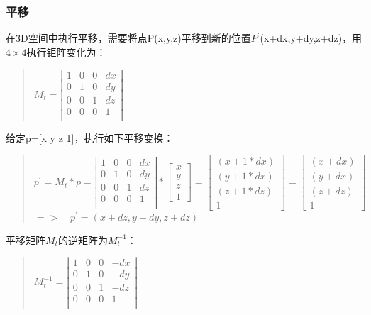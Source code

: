 \documentclass[a4paper,10pt]{article}
\begin{document}
\begin{CJK}{UTF8}{song}
\subsubsection{平移}
在3D空间中执行平移，需要将点P(x,y,z)平移到新的位置$P^{'}$(x+dx,y+dy,z+dz)，用$4\times 4$执行钜阵变化为：
\begin{quote}
\begin{math}
M_{t}=\left|
\begin{array}{cccc}
1&0&0&dx \\
0&1&0&dy \\
0&0&1&dz \\
0&0&0&1 \\
\end{array}
\right|
\end{math} 
\end{quote}
给定p=[x y z 1]，执行如下平移变换：
\begin{quote} 
\begin{math}
p^{'}=M_{t}*p= \left|
\begin{array}{cccc}
1&0&0&dx \\
0&1&0&dy \\
0&0&1&dz \\
0&0&0&1 \\
\end{array}
\right|*
\left[\begin{array}{c}
x  \\
y \\
z  \\
1 
\end{array}\right]
=\left[
\begin{array}{c} 
(x+1*dx) \\
(y+1*dx) \\
 (z+1*dz) \\
 1 
\end{array} \right]
=\left[ \begin{array}{c} (x+dx) \\ (y+dx) \\ (z+dz) \\ 1  \end{array} \right]
\end{math}  \\

\begin{math}
=>\quad p^{'}=(x+dz,y+dy,z+dz)
\end{math}
\end{quote}
平移矩阵$M_{t}$的逆矩阵为$M_{t}^{-1}$：
\begin{quote}
\begin{math}
M_{t}^{-1}=\left|
\begin{array}{cccc}
1&0&0&-dx \\
0&1&0&-dy \\
0&0&1&-dz \\
0&0&0&1 \\
\end{array}
\right|
\end{math}
\end{quote}

\end{CJK}
\end{document}

